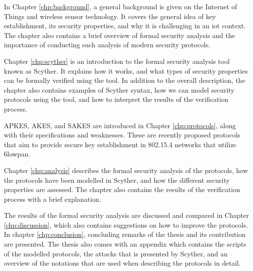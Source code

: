 In Chapter \ref{chp:background}, a general background is given on the Internet of Things and wireless sensor technology. It covers the general idea of key establishment, its security properties, and why it is challenging in an \gls{iot} context. The chapter also contains a brief overview of formal security analysis and the importance of conducting such analysis of modern security protocols.

Chapter \ref{chp:scyther} is an introduction to the formal security analysis tool known as Scyther. It explains how it works, and what types of security properties can be formally verified using the tool. In addition to the overall description, the chapter also contains examples of Scyther syntax, how we can model security protocols using the tool, and how to interpret the results of the verification process.

APKES, AKES, and SAKES are introduced in Chapter \ref{chp:protocols}, along with their specifications and weaknesses. These are recently proposed protocols that aim to provide secure key establishment in 802.15.4 networks that utilize \gls{6lowpan}.

Chapter \ref{chp:analysis} describes the formal security analysis of the protocols, how the protocols have been modelled in Scyther, and how the different security properties are assessed. The chapter also contains the results of the verification process with a brief explanation.

The results of the formal security analysis are discussed and compared in Chapter \ref{chp:discussion}, which also contains suggestions on how to improve the protocols.  In chapter \ref{chp:conclusion}, concluding remarks of the thesis and its contribution are presented. The thesis also comes with an appendix which contains the scripts of the modelled protocols, the attacks that is presented by Scyther, and an overview of the notations that are used when describing the protocols in detail.